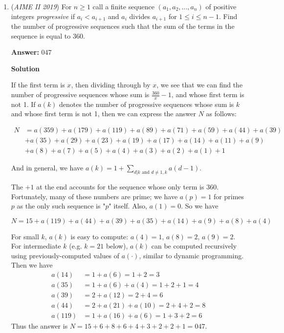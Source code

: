 \begin{enumerate}
 Note point $K$ where $\omega_1$ and $\omega_2$ intersect, and use a ruler to measure length $AK$. If the diagram is drawn accurate and large enough, you should get $AK$ to be $4.5 = {\frac{9}{2}}$, giving an answer of $9+2 = \boxed{011}$.

 


	\item (\textit{AIME II 2019}) For $n\ge1$ call a finite sequence $(a_1,a_2,\ldots,a_n)$ of positive integers \textit{progressive} if $a_i<a_{i+1}$ and $a_i$ divides $a_{i+1}$ for $1\le i\le n-1$. Find the number of progressive sequences such that the sum of the terms in the sequence is equal to $360.$

 \textbf{Answer: }047



\textbf{Solution}

If the first term is $x$, then dividing through by $x$, we see that we can find the number of progressive sequences whose sum is $\frac{360}{x} - 1$, and whose first term is not 1. If $a(k)$ denotes the number of progressive sequences whose sum is $k$ and whose first term is not 1, then we can express the answer $N$ as follows:

 
 \begin{align*}N &= a(359) + a(179) + a(119) + a(89) + a(71) + a(59) + a(44) + a(39) \\ &+ a(35) + a(29) + a(23) + a(19) + a(17) + a(14) + a(11) + a(9) \\ &+ a(8) + a(7) + a(5) + a(4) + a(3) + a(2) + a(1) + 1 \end{align*}


 And in general, we have $a(k) = 1+\sum_{d|k\text{ and } d\ne 1,k}a(d-1)$.

 The $+1$ at the end accounts for the sequence whose only term is 360. Fortunately, many of these numbers are prime; we have $a(p) = 1$ for primes $p$ as the only such sequence is "$p$" itself. Also, $a(1) = 0$. So we have

 
 \[N = 15 + a(119) + a(44) + a(39) + a(35) + a(14) + a(9) + a(8) + a(4)\]

 For small $k$, $a(k)$ is easy to compute: $a(4) = 1$, $a(8) = 2$, $a(9) = 2$. For intermediate $k$ (e.g. $k=21$ below), $a(k)$ can be computed recursively using previously-computed values of $a(\cdot)$, similar to dynamic programming. Then we have
 \begin{align*} a(14) &= 1+a(6) = 1+2 = 3\\ a(35) &= 1+a(6)+a(4) = 1 + 2 + 1 = 4 \\ a(39) &= 2 + a(12) = 2+4 = 6 \\ a(44) &= 2 + a(21) + a(10) = 2+4+2=8 \\ a(119) &= 1 + a(16) + a(6) = 1 + 3 + 2 = 6 \end{align*}
Thus the answer is $N = 15+6+8+6+4+3+2+2+1 = \boxed{047}$.


\end{enumerate}
